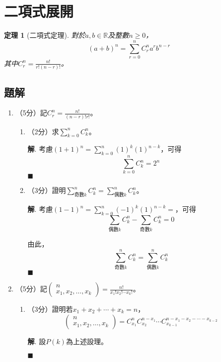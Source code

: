 \documentclass[12pt]{article}
\newtheorem*{theorem}{定理}
\newenvironment*{sol}{\par \textbf{解}.}{\hfill$\blacksquare$}
\begin{document}
    \section*{二項式展開}

    \begin{theorem}[二項式定理]
        對於$a,b\in\mathbb{R}$及整數$n\geq 0$，$$(a+b)^n=\sum_{r=0}^{n}C_r^n a^rb^{n-r}$$其中$C_r^n=\frac{n!}{r!(n-r)!}$。
    \end{theorem}

    \subsection*{題解}

    \begin{enumerate}
        \item （5分）記$C_r^n=\frac{n!}{(n-r)!r!}$。\begin{enumerate}
            \item （2分）求$\sum_{k=0}^n C_k^n$。\begin{sol}
                考慮$(1+1)^n=\sum_{k=0}^{n}(1)^k(1)^{n-k}$，可得$$\sum_{k=0}^{n}C_k^n=2^n$$
            \end{sol}
            \item （3分）證明$\sum_{\textrm{奇數}k}^n C_k^n=\sum_{\textrm{偶數}k}^n C_k^n$。\begin{sol}
                考慮$(1-1)^n=\sum_{k=0}^{n}(-1)^k(1)^{n-k}=$，可得$$\sum_{\textrm{偶數}k}C_k^n-\sum_{\textrm{奇數}k}C_k^n=0$$

                由此，$$\sum_{\textrm{奇數}k}^n C_k^n=\sum_{\textrm{偶數}k}^n C_k^n$$
            \end{sol}
        \end{enumerate}
        \item （5分）記$\begin{pmatrix}
            n\\x_1,x_2,\dots,x_k
        \end{pmatrix}=\frac{n!}{x_1!x_2!\cdots x_k!}$。\begin{enumerate}
            \item （3分）證明若$x_1+x_2+\cdots+x_k=n$，$$\begin{pmatrix}
                n\\x_1,x_2,\dots,x_k
            \end{pmatrix}=C_{x_1}^n C_{x_2}^{n-x_1}\cdots C_{x_{k-1}}^{n-x_1-x_2-\cdots-x_{k-2}}$$\begin{sol}
                設$P(k)$為上述設理。


\end{sol}
\end{enumerate}
\end{enumerate}
\end{document}
